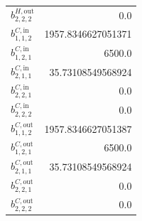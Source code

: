 \documentclass{article}%
\begin{document}
\begin{multicols*}{3}
\begin{supertabular}{lr}
	$b_{2,2,2}^{H,\text{out}}$ & 0.0 \\%
	$b_{1,1,2}^{C,\text{in}}$ & 1957.8346627051371 \\%
	$b_{1,2,1}^{C,\text{in}}$ & 6500.0 \\%
	$b_{2,1,1}^{C,\text{in}}$ & 35.73108549568924 \\%
	$b_{2,2,1}^{C,\text{in}}$ & 0.0 \\%
	$b_{2,2,2}^{C,\text{in}}$ & 0.0 \\%
	$b_{1,1,2}^{C,\text{out}}$ & 1957.8346627051387 \\%
	$b_{1,2,1}^{C,\text{out}}$ & 6500.0 \\%
	$b_{2,1,1}^{C,\text{out}}$ & 35.73108549568924 \\%
	$b_{2,2,1}^{C,\text{out}}$ & 0.0 \\%
	$b_{2,2,2}^{C,\text{out}}$ & 0.0 \\%
\end{supertabular}%
\end{multicols*}%
\end{document}
